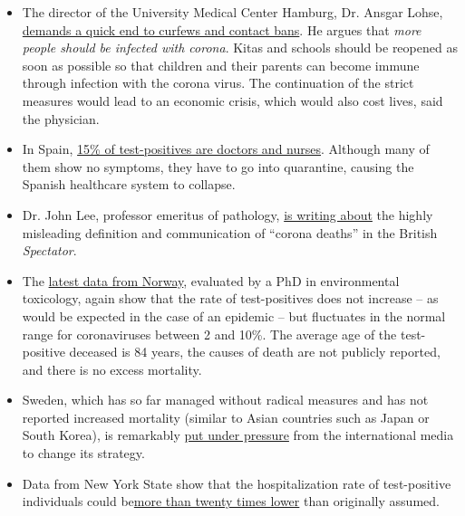 \begin{itemize}
\tightlist
\item
  The director of the University Medical Center Hamburg, Dr. Ansgar
  Lohse,
  \href{https://www.mopo.de/hamburg/uke-infektiologe-fordert-es-muessen-sich-mehr-menschen-mit-corona-infizieren-36483636}{demands
  a quick end to curfews and contact bans}. He argues that \emph{more
  people should be infected with corona}. Kitas and schools should be
  reopened as soon as possible so that children and their parents can
  become immune through infection with the corona virus. The
  continuation of the strict measures would lead to an economic crisis,
  which would also cost lives, said the physician.
\item
  In Spain,
  \href{https://www.heise.de/tp/features/Das-ist-keine-Krise-sondern-eine-Katastrophe-4694104.html}{15\%
  of test-positives are doctors and nurses}. Although many of them show
  no symptoms, they have to go into quarantine, causing the Spanish
  healthcare system to collapse.
\item
  Dr. John Lee, professor emeritus of pathology,
  \href{https://www.spectator.co.uk/article/how-to-understand-and-report-figures-for-covid-19-deaths-}{is
  writing about} the highly misleading definition and communication of
  ``corona deaths'' in the British \emph{Spectator}.
\item
  The
  \href{https://swprs.files.wordpress.com/2020/04/die-lage-in-norwegen.pdf}{latest
  data from Norway}, evaluated by a PhD in environmental toxicology,
  again show that the rate of test-positives does not increase -- as
  would be expected in the case of an epidemic -- but fluctuates in the
  normal range for coronaviruses between 2 and 10\%. The average age of
  the test-positive deceased is 84 years, the causes of death are not
  publicly reported, and there is no excess mortality.
\item
  Sweden, which has so far managed without radical measures and has not
  reported increased mortality (similar to Asian countries such as Japan
  or South Korea), is remarkably
  \href{https://www.theguardian.com/world/2020/mar/30/catastrophe-sweden-coronavirus-stoicism-lockdown-europe}{put
  under pressure} from the international media to change its strategy.
\item
  Data from New York State show that the hospitalization rate of
  test-positive individuals could
  be\href{https://www.nytimes.com/2020/03/27/nyregion/new-rochelle-coronavirus.html}{more
  than twenty times lower} than originally assumed.

\end{itemize}
